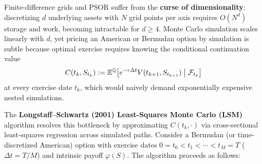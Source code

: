 Finite-difference grids and PSOR suffer from the \textbf{curse of dimensionality}: discretizing $d$ underlying assets with $N$ grid points per axis requires $O(N^d)$ storage and work, becoming intractable for $d \ge 4$. Monte Carlo simulation scales linearly with $d$, yet pricing an American or Bermudan option by simulation is subtle because optimal exercise requires knowing the conditional continuation value
\[
C(t_k, S_{t_k}) := \mathbb{E}^{\mathbb{Q}}\!\left[e^{-r\Delta t} V(t_{k+1}, S_{t_{k+1}}) \;\middle|\; \mathcal{F}_{t_k}\right]
\]
at every exercise date $t_k$, which would naively demand exponentially expensive nested simulations.

The \textbf{Longstaff--Schwartz (2001) Least-Squares Monte Carlo (LSM)} algorithm resolves this bottleneck by approximating $C(t_k, \cdot)$ via cross-sectional least-squares regression across simulated paths. Consider a Bermudan (or time-discretized American) option with exercise dates $0 = t_0 < t_1 < \cdots < t_M = T$ ($\Delta t = T / M$) and intrinsic payoff $\varphi(S)$. The algorithm proceeds as follows:
